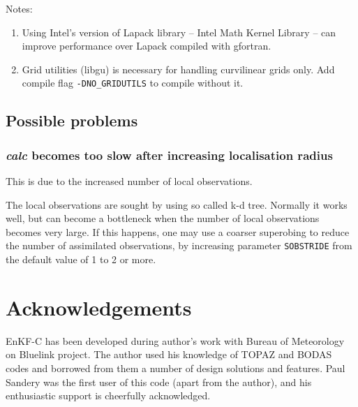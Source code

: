 \documentclass[11pt]{report}
\begin{document}
Notes:
\vspace{-3mm}
\begin{enumerate}
\item Using Intel's version of Lapack library -- Intel Math Kernel Library -- can improve performance over Lapack compiled with gfortran.
\item Grid  utilities (libgu) is necessary for handling curvilinear grids only.
Add compile flag \verb|-DNO_GRIDUTILS| to compile without it.
\end{enumerate}

\section{Possible problems}

\subsection{\emph{calc} becomes too slow after increasing localisation radius}

This is due to the increased number of local observations.

The local observations are sought by using so called k-d tree.
Normally it works well, but can become a bottleneck when the number of local observations becomes very large.
If this happens, one may use a coarser superobing to reduce the number of assimilated observations, by increasing parameter \verb|SOBSTRIDE| from the default value of 1 to 2 or more.

\chapter*{Acknowledgements}

EnKF-C has been developed during author's work with Bureau of Meteorology on Bluelink project.
The author used his knowledge of TOPAZ \citep{sak12b} and BODAS \citep{oke08b} codes and borrowed from them a number of design solutions and features.
Paul Sandery was the first user of this code (apart from the author), and his enthusiastic support is cheerfully acknowledged.

\clearpage

\nocite{eve94a}
\nocite{eve03a}
\nocite{hun04a}
\nocite{hun07a}
\nocite{sak08a}
\nocite{sak10a}
\nocite{sak11a}



\end{document}
